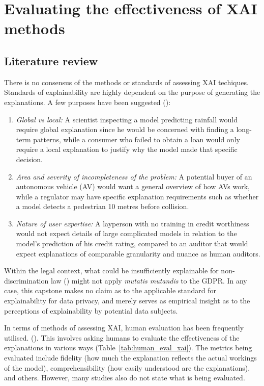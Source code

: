 \section{Evaluating the effectiveness of XAI methods}
\subsection{Literature review}
There is no consensus of the methods or standards of assessing XAI techiques. Standards of explainability are highly dependent on the purpose of generating the explanations. A few purposes have been suggested (\cite{doshi-velez2017}):
\begin{enumerate}
	\item \textit{Global vs local:} A scientist inspecting a model predicting rainfall would require global explanation since he would be concerned with finding a long-term patterns, while a consumer who failed to obtain a loan would only require a local explanation to justify why the model made that specific decision.
	\item \textit{Area and severity of incompleteness of the problem:} A potential buyer of an autonomous vehicle (AV) would want a general overview of how AVs work, while a regulator may have specific explanation requirements such as whether a model detects a pedestrian 10 metres before collision.
	\item \textit{Nature of user expertise:} A layperson with no training in credit worthiness would not expect details of large complicated models in relation to the model's prediction of his credit rating, compared to an auditor that would expect explanations of comparable granularity and nuance as human auditors.
\end{enumerate}

Within the legal context, what could be insufficiently explainable for non-discrimination law (\cite{vale2022explainable}) might not apply \textit{mutatis mutandis} to the GDPR. In any case, this capstone makes no claim as to the applicable standard for explainability for data privacy, and merely serves as empirical insight as to the perceptions of explainability by potential data subjects.

In terms of methods of assessing XAI, human evaluation has been frequently utilised. (\cite{danilevsky2020}). This involves asking humans to evaluate the effectiveness of the explanations in various ways (Table~\ref{tab:human_eval_xai}). The metrics being evaluated include fidelity (how much the explanation reflects the actual workings of the model), comprehensibility (how easily understood are the explanations), and others. However, many studies also do not state what is being evaluated. 

